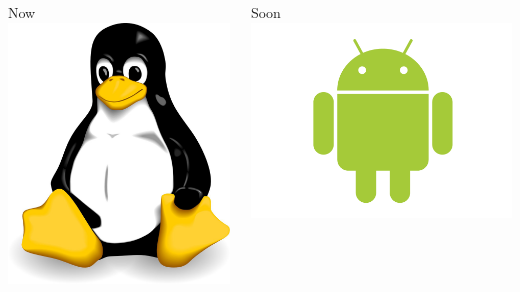 \documentclass[12pt]{beamer}
\begin{document}
\begin{frame}
\begin{columns}
\begin{block}{Now}
  \includegraphics[height=0.2\textheight]{img/linux}
  \end{block}
\pause
{}
  \begin{block}{Soon}
  \centering
  \includegraphics[height=0.15\textheight]{img/android} \\

\end{block}
\end{columns}
\end{frame}
\end{document}
